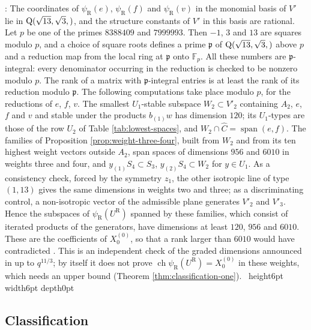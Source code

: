 \documentclass[leqno]{article}
\newcommand{\Q}{\mathrm{Q}}
\newcommand{\qed}{\hfill \vrule height6pt  width6pt depth0pt}
\let\i\relax
\newcommand{\i}{\mathrm{i}}
\newenvironment{proof}[1][]{\noindent {\it Proof #1} : }{\hbox{~}\qed
\smallskip
}
\numberwithin{equation}{section}
\begin{document}
\begin{proof}
The coordinates of $\psi_{\mathrm R}(e)$, $\psi_{\mathrm R}(f)$ and $\psi_{\mathrm R}(v)$ in the monomial basis of $V'$ lie in $\Q(\sqrt{13},\sqrt 3,\i)$, and the structure constants of $V'$ in this basis are rational. Let $p$ be one of the primes $8388409$ and $7999993$. Then $-1$, $3$ and $13$ are squares modulo $p$, and a choice of square roots defines a prime $\mathfrak p$ of $\Q(\sqrt{13},\sqrt 3,\i)$ above $p$ and a reduction map from the local ring at $\mathfrak p$ onto $\mathbb F_p$. All these numbers are $\mathfrak p$-integral: every denominator occurring in the reduction is checked to be nonzero modulo $p$. The rank of a matrix with $\mathfrak p$-integral entries is at least the rank of its reduction modulo $\mathfrak p$. The following computations take place modulo $p$, for the reductions of $e$, $f$, $v$. The smallest $U_1$-stable subspace $W_2 \subset V'_2$ containing $A_2$, $e$, $f$ and $v$ and stable under the products $b_{(1)}w$ has dimension $120$; its $U_1$-types are those of the row $U_2$ of Table \ref{tab:lowest-spaces}, and $W_2 \cap \widehat C = \operatorname{span}(e,f)$. The families of Proposition \ref{prop:weight-three-four}, built from $W_2$ and from its ten highest weight vectors outside $A_2$, span spaces of dimensions $956$ and $6010$ in weights three and four, and $y_{(1)}S_4 \subset S_3$, $y_{(2)}S_4 \subset W_2$ for $y \in U_1$. As a consistency check, forced by the symmetry $z_1$, the other isotropic line of type $(1,13)$ gives the same dimensions in weights two and three; as a discriminating control, a non-isotropic vector of the admissible plane generates $V'_2$ and $V'_3$. Hence the subspaces of $\psi_{\mathrm R}(U^{\mathrm R})$ spanned by these families, which consist of iterated products of the generators, have dimensions at least $120$, $956$ and $6010$. These are the coefficients of $X^{(0)}_0$, so that a rank larger than $6010$ would have contradicted \cite{Rie26}. This is an independent check of the graded dimensions announced in \cite{Rie26} up to $q^{11/3}$; by itself it does not prove $\operatorname{ch}\psi_{\mathrm R}(U^{\mathrm R}) = X^{(0)}_0$ in these weights, which needs an upper bound (Theorem \ref{thm:classification-one}).
\end{proof}

\subsection{Classification}
\label{subsec:classification}
\end{document}
